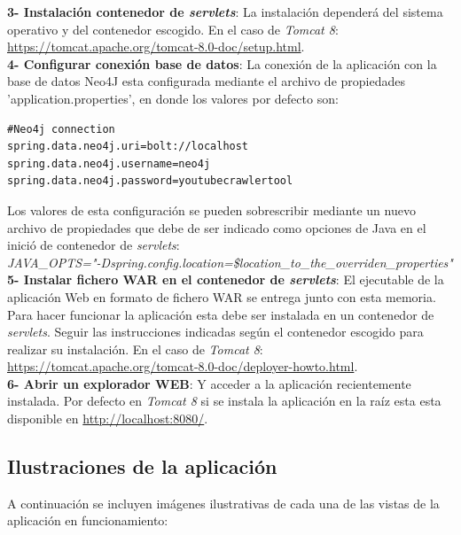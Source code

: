 \documentclass[11pt,a4paper]{article}
\begin{document}
\noindent\textbf{3- Instalación contenedor de \textit{servlets}}: La instalación dependerá del sistema operativo y del contenedor escogido. En el caso de \textit{Tomcat 8}: \url{https://tomcat.apache.org/tomcat-8.0-doc/setup.html}.\\

\noindent\textbf{4- Configurar conexión base de datos}: La conexión de la aplicación con la base de datos Neo4J esta configurada mediante el archivo de propiedades 'application.properties', en donde los valores por defecto son:
\begin{lstlisting}[style=C]
#Neo4j connection
spring.data.neo4j.uri=bolt://localhost
spring.data.neo4j.username=neo4j
spring.data.neo4j.password=youtubecrawlertool
\end{lstlisting}
Los valores de esta configuración se pueden sobrescribir mediante un nuevo archivo de propiedades que debe de ser indicado como opciones de Java en el inició de contenedor de \textit{servlets}:\\
\textit{JAVA\_OPTS="\--Dspring.config.location=\$location\_to\_the\_overriden\_properties"}
\\

\noindent\textbf{5- Instalar fichero WAR en el contenedor de \textit{servlets}}: El ejecutable de la aplicación Web en formato de fichero WAR se entrega junto con esta memoria. Para hacer funcionar la aplicación esta debe ser instalada en un contenedor de \textit{servlets}. Seguir las instrucciones indicadas según el contenedor escogido para realizar su instalación. En el caso de \textit{Tomcat 8}: \url{https://tomcat.apache.org/tomcat-8.0-doc/deployer-howto.html}.
\\

\noindent\textbf{6- Abrir un explorador WEB}: Y acceder a la aplicación recientemente instalada. Por defecto en \textit{Tomcat 8} si se instala la aplicación en la raíz esta esta disponible en \url{http://localhost:8080/}.

\newpage 

\subsection{Ilustraciones de la aplicación}\label{IlustracionApp} 
A continuación se incluyen imágenes ilustrativas de cada una de las vistas de la aplicación en funcionamiento:
\end{document}
